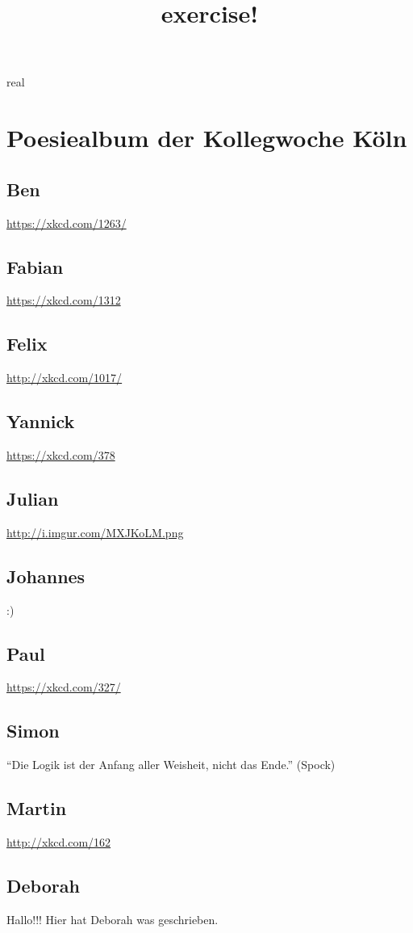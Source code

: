 real \documentclass[12pt]{scrartcl}
\begin{document}
\title{exercise!}
\maketitle
\section{Poesiealbum der Kollegwoche Köln}
\subsection{Ben}
\url{https://xkcd.com/1263/}
\subsection{Fabian}
\url{https://xkcd.com/1312}
\subsection{Felix}
\url{http://xkcd.com/1017/}
\subsection{Yannick}
\url{https://xkcd.com/378}
\subsection{Julian}
\url{http://i.imgur.com/MXJKoLM.png}
\subsection{Johannes}
:)
\subsection{Paul}
\url{https://xkcd.com/327/}

\subsection{Simon}
``Die Logik ist der Anfang aller Weisheit, nicht das Ende.'' (Spock)
\subsection{Martin}
\url{http://xkcd.com/162}

\subsection{Deborah}
Hallo!!! Hier hat Deborah was geschrieben.
\end{document}
